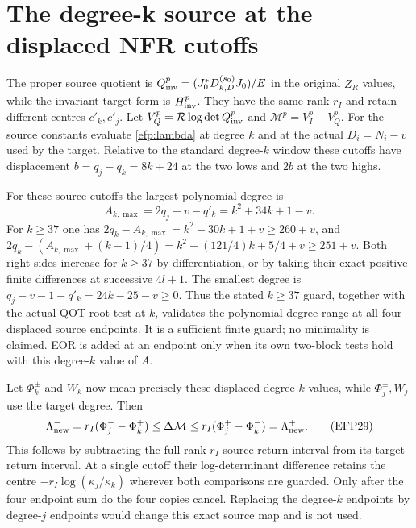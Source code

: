 \documentclass[11pt,a4paper]{article}
\begin{document}
\section{The degree-k source at the displaced NFR cutoffs}
The proper source quotient is
$Q_{\rm inv}^{p}=(J_0^*D_{k,D}^{(s_0)}J_0)/E$ in the original
$Z_R$ values, while the invariant target form is $H_{\rm inv}^p$.
They have the same rank $r_I$ and retain different centres $c'_k,c'_j$.
Let $V_Q^p=\mathcal R\log\det Q_{\rm inv}^p$ and
$\mathcal M^p=V_I^p-V_Q^p$.
For the source constants evaluate \eqref{efp:lambda} at degree $k$
and at the actual $D_i=N_i-v$ used by the target.
Relative to the standard degree-$k$ window these cutoffs have
displacement $b=q_j-q_k=8k+24$ at the two lows and $2b$ at the two highs.

For these source cutoffs the largest polynomial degree is
\[
A_{k,\max}=2q_j-v-q'_k=k^2+34k+1-v.
\tag{EFP28}\label{efp:source-degree}
\]
For $k\ge37$ one has
$2q_k-A_{k,\max}=k^2-30k+1+v\ge260+v$,
and
$2q_k-(A_{k,\max}+(k-1)/4)
 =k^2-(121/4)k+5/4+v\ge251+v$.
Both right sides increase for $k\ge37$ by differentiation, or by
taking their exact positive finite differences at successive $4l+1$.
The smallest degree is
$q_j-v-1-q'_k=24k-25-v\ge0$.
Thus the stated $k\ge37$ guard, together with the actual QOT root
test at $k$, validates the polynomial degree range at all four
displaced source endpoints. It is a sufficient finite guard; no
minimality is claimed. EOR is added at an endpoint only when its
own two-block tests hold with this degree-$k$ value of $A$.

Let $\Phi_k^\pm$ and $W_k$ now mean precisely these displaced
degree-$k$ values, while $\Phi_j^\pm,W_j$ use the target degree.
Then
\[
\Lambda_{\rm new}^-=r_I(\Phi_j^--\Phi_k^+)
 \le\Delta\mathcal M
 \le r_I(\Phi_j^+-\Phi_k^-)=\Lambda_{\rm new}^+ .
\tag{EFP29}\label{efp:nfr}
\]
This follows by subtracting the full rank-$r_I$ source-return
interval from its target-return interval. At a single cutoff their
log-determinant difference retains the centre
$-r_I\log(\kappa_j/\kappa_k)$ wherever both comparisons are guarded.
Only after the four endpoint sum do the four copies cancel.
Replacing the degree-$k$ endpoints by degree-$j$ endpoints would
change this exact source map and is not used.
\end{document}
